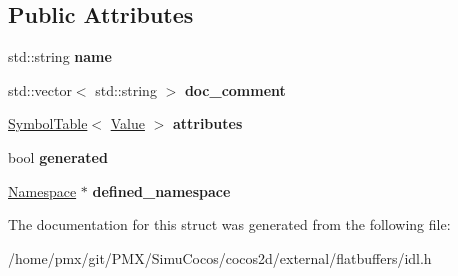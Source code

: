 \subsection*{Public Attributes}
\begin{DoxyCompactItemize}
\item 
\mbox{\label{structflatbuffers_1_1Definition_a7723ad279d193fec1d5a4bbb6b020ae0}} 
std\+::string {\bfseries name}
\item 
\mbox{\label{structflatbuffers_1_1Definition_a83efd7588619300779981ae501986bb8}} 
std\+::vector$<$ std\+::string $>$ {\bfseries doc\+\_\+comment}
\item 
\mbox{\label{structflatbuffers_1_1Definition_af06fa04d040903cfbea3fab16c70c2b1}} 
\hyperlink{classflatbuffers_1_1SymbolTable}{Symbol\+Table}$<$ \hyperlink{structflatbuffers_1_1Value}{Value} $>$ {\bfseries attributes}
\item 
\mbox{\label{structflatbuffers_1_1Definition_a7d4ba4a89c437c2d5bd8b09f17179d05}} 
bool {\bfseries generated}
\item 
\mbox{\label{structflatbuffers_1_1Definition_a838b3ba97a30b91b538adbda39f4015e}} 
\hyperlink{structflatbuffers_1_1Namespace}{Namespace} $\ast$ {\bfseries defined\+\_\+namespace}
\end{DoxyCompactItemize}


The documentation for this struct was generated from the following file\+:\begin{DoxyCompactItemize}
\item 
/home/pmx/git/\+P\+M\+X/\+Simu\+Cocos/cocos2d/external/flatbuffers/idl.\+h\end{DoxyCompactItemize}
